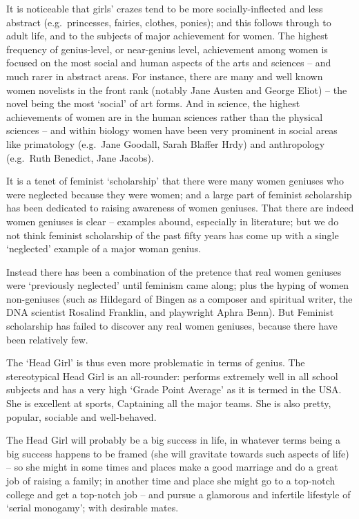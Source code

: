 \documentclass[
]{book}
\begin{document}
It is noticeable that girls' crazes tend to be more socially-inflected and less abstract (e.g.~princesses, fairies, clothes, ponies); and this follows through to adult life, and to the subjects of major achievement for women. The highest frequency of genius-level, or near-genius level, achievement among women is focused on the most social and human aspects of the arts and sciences -- and much rarer in abstract areas. For instance, there are many and well known women novelists in the front rank (notably Jane Austen and George Eliot) -- the novel being the most `social' of art forms. And in science, the highest achievements of women are in the human sciences rather than the physical sciences -- and within biology women have been very prominent in social areas like primatology (e.g.~Jane Goodall, Sarah Blaffer Hrdy) and anthropology (e.g.~Ruth Benedict, Jane Jacobs).

It is a tenet of feminist `scholarship' that there were many women geniuses who were neglected because they were women; and a large part of feminist scholarship has been dedicated to raising awareness of women geniuses. That there are indeed women geniuses is clear -- examples abound, especially in literature; but we do not think feminist scholarship of the past fifty years has come up with a single `neglected' example of a major woman genius.

Instead there has been a combination of the pretence that real women geniuses were `previously neglected' until feminism came along; plus the hyping of women non-geniuses (such as Hildegard of Bingen as a composer and spiritual writer, the DNA scientist Rosalind Franklin, and playwright Aphra Benn). But Feminist scholarship has failed to discover any real women geniuses, because there have been relatively few.

The `Head Girl' is thus even more problematic in terms of genius. The stereotypical Head Girl is an all-rounder: performs extremely well in all school subjects and has a very high `Grade Point Average' as it is termed in the USA. She is excellent at sports, Captaining all the major teams. She is also pretty, popular, sociable and well-behaved.

The Head Girl will probably be a big success in life, in whatever terms being a big success happens to be framed (she will gravitate towards such aspects of life) -- so she might in some times and places make a good marriage and do a great job of raising a family; in another time and place she might go to a top-notch college and get a top-notch job -- and pursue a glamorous and infertile lifestyle of `serial monogamy'; with desirable mates.
\end{document}

